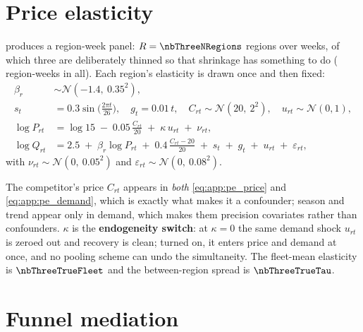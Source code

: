 \section{Price elasticity}
\label{app:dgp:pe}

 produces a region-week panel: $R = \nbThreeNRegions$ regions over
\nbThreeNWeeks{} weeks, of which three are deliberately thinned so that shrinkage has something to
do (\nbThreeNObs{} region-weeks in all). Each region's elasticity is drawn once and then fixed:
%
\begin{align}
  \beta_r &\sim \mathcal N\!\left(-1.4,\ 0.35^{2}\right), \label{eq:app:pe_beta}\\
  s_t &= 0.3 \sin\!\Big(\tfrac{2\pi t}{26}\Big), \quad g_t = 0.01\,t, \quad
        C_{rt} \sim \mathcal N\!\left(20,\ 2^{2}\right), \quad
        u_{rt} \sim \mathcal N(0,1), \label{eq:app:pe_latent}\\
  \log P_{rt} &= \log 15 \;-\; 0.05\,\frac{C_{rt}}{20} \;+\; \kappa\, u_{rt} \;+\; \nu_{rt},
        \label{eq:app:pe_price}\\
  \log Q_{rt} &= 2.5 \;+\; \beta_r \log P_{rt} \;+\; 0.4\,\frac{C_{rt} - 20}{20} \;+\; s_t \;+\; g_t
        \;+\; u_{rt} \;+\; \varepsilon_{rt}, \label{eq:app:pe_demand}
\end{align}
%
with $\nu_{rt} \sim \mathcal N(0,\ 0.05^{2})$ and
$\varepsilon_{rt} \sim \mathcal N(0,\ 0.08^{2})$.

The competitor's price $C_{rt}$ appears in \emph{both} \cref{eq:app:pe_price} and
\cref{eq:app:pe_demand}, which is exactly what makes it a confounder; season and trend appear only
in demand, which makes them precision covariates rather than confounders. $\kappa$ is the
\textbf{endogeneity switch}: at $\kappa = 0$ the same demand shock $u_{rt}$ is zeroed out and
recovery is clean; turned on, it enters price and demand at once, and no pooling scheme can undo
the simultaneity. The fleet-mean elasticity is $\nbThreeTrueFleet$ and the between-region spread is
$\nbThreeTrueTau$.

\section{Funnel mediation}
\label{app:dgp:med}

